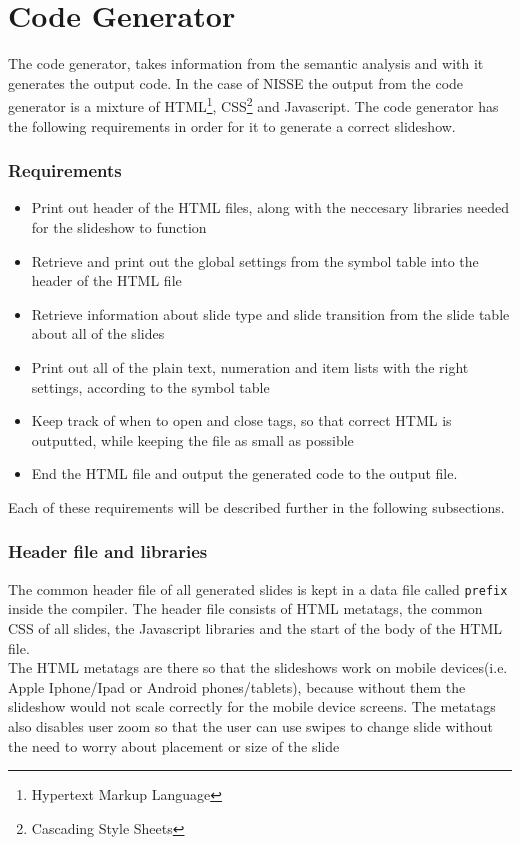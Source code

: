 \chapter{Code Generator}

The code generator, takes information from the semantic analysis and with it generates the output code. In the case of NISSE the output from the code generator is a mixture of HTML\footnote{Hypertext Markup Language}, CSS\footnote{Cascading Style Sheets} and Javascript. The code generator has the following requirements in order for it to generate a correct slideshow.

\subsection{Requirements}
\begin{itemize}
  \item Print out header of the HTML files, along with the neccesary libraries needed for the slideshow to function
  \item Retrieve and print out the global settings from the symbol table into the header of the HTML file
  \item Retrieve information about slide type and slide transition from the slide table about all of the slides
  \item Print out all of the plain text, numeration and item lists with the right settings, according to the symbol table
  \item Keep track of when to open and close tags, so that correct HTML is outputted, while keeping the file as small as possible
  \item End the HTML file and output the generated code to the output file.
\end{itemize}
Each of these requirements will be described further in the following subsections.

\subsection{Header file and libraries}
The common header file of all generated slides is kept in a data file called \texttt{prefix} inside the compiler. The header file consists of HTML metatags, the common CSS of all slides, the Javascript libraries and the start of the body of the HTML file. \\

The HTML metatags are there so that the slideshows work on mobile devices(i.e. Apple Iphone/Ipad or Android phones/tablets), because without them the slideshow would not scale correctly for the mobile device screens. The metatags also disables user zoom so that the user can use swipes to change slide without the need to worry about placement or size of the slide\\

